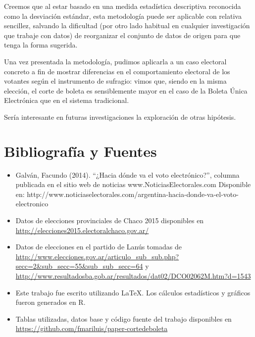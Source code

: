 \documentclass[12pt,a4paper]{article}
\begin{document}
Creemos que al estar basado en una medida estadística descriptiva reconocida
como la desviación estándar, esta metodología puede ser aplicable con relativa
sencillez, salvando la dificultad (por otro lado habitual en cualquier
investigación que trabaje con datos) de reorganizar el conjunto de datos de
origen para que tenga la forma sugerida.

Una vez presentada la metodología, pudimos aplicarla a un caso electoral
concreto a fin de mostrar diferencias en el comportamiento electoral de los
votantes según el instrumento de sufragio: vimos que, siendo en la misma
elección, el corte de boleta es sensiblemente mayor en el caso de la Boleta
Única Electrónica que en el sistema tradicional.

Sería interesante en futuras investigaciones la exploración de otras hipótesis.

\pagebreak

\section{Bibliografía y Fuentes}

\begin{itemize}
  \item Galván, Facundo (2014). “¿Hacia dónde va el voto electrónico?”, columna publicada en el sitio web de noticias www.NoticiasElectorales.com Disponible en: http://www.noticiaselectorales.com/argentina-hacia-donde-va-el-voto-electronico
  \item Datos de elecciones provinciales de Chaco 2015 disponibles en \url{http://elecciones2015.electoralchaco.gov.ar/}
  \item Datos de elecciones en el partido de Lanús tomadas de
    \url{http://www.elecciones.gov.ar/articulo_sub_sub.php?secc=2&sub_secc=55&sub_sub_secc=64}
    y \url{http://www.resultadosba.gob.ar/resultados/dat02/DCO02062M.htm?d=1543}
  \item Este trabajo fue escrito utilizando \LaTeX. Los cálculos estadísticos y
    gráficos fueron generados en R.
  \item Tablas utilizadas, datos base y código fuente del trabajo disponibles en \url{https://github.com/fmariluis/paper-cortedeboleta}
\end{itemize}

\tableofcontents
\listoftables
\listoffigures
\end{document}
